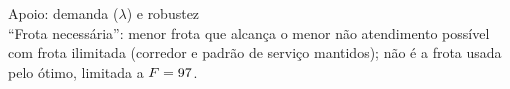 \documentclass[aspectratio=169,11pt]{beamer}
\begin{document}
\begin{frame}{Apoio: demanda ($\lambda$) e robustez}
\centering\scriptsize
\resizebox{\linewidth}{!}{}\\[0.3em]
{\tiny ``Frota necessária'': menor frota que alcança o menor não atendimento possível com frota ilimitada (corredor e padrão de serviço mantidos); não é a frota usada pelo ótimo, limitada a $F=97$.}
\vspace{0.6em}

\resizebox{0.8\linewidth}{!}{}
\end{frame}
\end{document}
